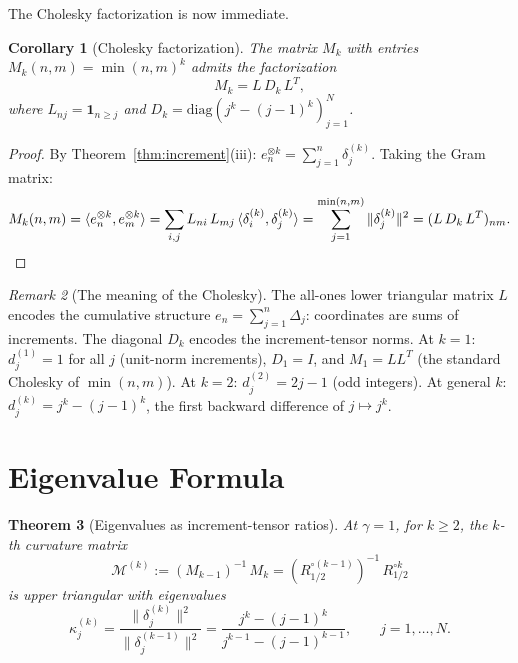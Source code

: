 \documentclass[11pt,a4paper]{article}
\theoremstyle{plain}
\newtheorem{theorem}{Theorem}[section]
\newtheorem{corollary}[theorem]{Corollary}
\theoremstyle{definition}
\theoremstyle{remark}
\newtheorem{remark}[theorem]{Remark}
\begin{document}
The Cholesky factorization is now immediate.

\begin{corollary}[Cholesky factorization]
\label{cor:cholesky}
The matrix $M_k$ with entries $M_k(n,m) = \min(n,m)^k$
admits the factorization
\begin{equation}\label{eq:cholesky}
  M_k = L\,D_k\,L^T,
\end{equation}
where $L_{nj} = \mathbf{1}_{n \geq j}$ and
$D_k = \mathrm{diag}(j^k - (j{-}1)^k)_{j=1}^N$.
\end{corollary}

\begin{proof}
By Theorem~\ref{thm:increment}(iii):
$e_n^{\otimes k} = \sum_{j=1}^n \delta_j^{(k)}$.
Taking the Gram matrix:
\[
  M_k(n,m) = \langle e_n^{\otimes k}, e_m^{\otimes k}\rangle
  = \sum_{i,j} L_{ni}\,L_{mj}\,
    \langle \delta_i^{(k)}, \delta_j^{(k)} \rangle
  = \sum_{j=1}^{\min(n,m)} \|\delta_j^{(k)}\|^2
  = (L\,D_k\,L^T)_{nm}.
  \qedhere
\]
\end{proof}

\begin{remark}[The meaning of the Cholesky]
\label{rem:cholesky-meaning}
The all-ones lower triangular matrix $L$ encodes the
cumulative structure $e_n = \sum_{j=1}^n \Delta_j$:
coordinates are sums of increments.  The diagonal
$D_k$ encodes the increment-tensor norms.  At $k = 1$:
$d_j^{(1)} = 1$ for all $j$ (unit-norm increments),
$D_1 = I$, and $M_1 = LL^T$ (the standard Cholesky
of $\min(n,m)$).  At $k = 2$:
$d_j^{(2)} = 2j-1$ (odd integers).
At general $k$: $d_j^{(k)} = j^k - (j{-}1)^k$,
the first backward difference of $j \mapsto j^k$.
\end{remark}


\section{Eigenvalue Formula}\label{sec:eigenvalues}

\begin{theorem}[Eigenvalues as increment-tensor ratios]
\label{thm:eigenvalues}
At $\gamma = 1$, for $k \geq 2$, the $k$-th curvature
matrix
\[
  \mathcal{M}^{(k)}
  := (M_{k-1})^{-1}\,M_k
  = (R_{1/2}^{\circ(k-1)})^{-1}\,R_{1/2}^{\circ k}
\]
is upper triangular with eigenvalues
\begin{equation}\label{eq:eigenvalue-formula}
  \kappa_j^{(k)}
  = \frac{\|\delta_j^{(k)}\|^2}{\|\delta_j^{(k-1)}\|^2}
  = \frac{j^k - (j-1)^k}{j^{k-1} - (j-1)^{k-1}},
  \qquad j = 1,\ldots,N.
\end{equation}
\end{theorem}
\end{document}
